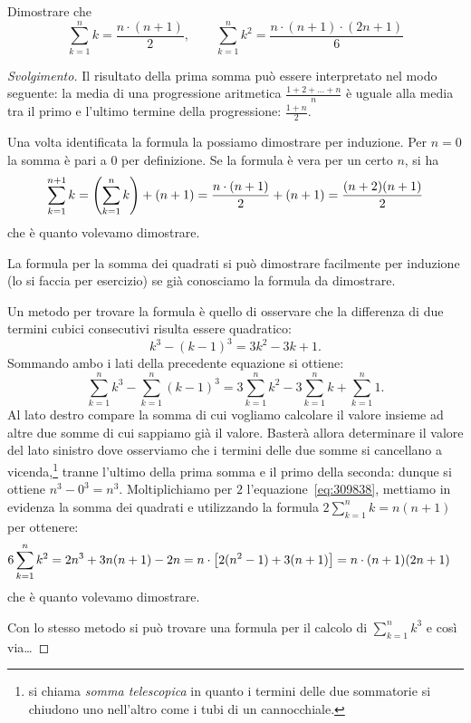 \begin{exercise}
  Dimostrare che 
  \[
    \sum_{k=1}^n k = \frac{n\cdot (n+1)}{2}, \qquad
    \sum_{k=1}^n k^2 = \frac{n\cdot (n+1)\cdot (2n+1)}{6}
  \]
\end{exercise}
\begin{proof}[Svolgimento]
Il risultato della prima somma può essere interpretato nel modo seguente:
la media di una progressione aritmetica $\frac{1+2+ \dots + n}{n}$ 
è uguale alla media tra il primo 
e l'ultimo termine della progressione: $\frac{1+n}{2}$.

Una volta identificata la formula la possiamo dimostrare per induzione.
Per $n=0$ la somma è pari a $0$ per definizione.
Se la formula è vera per un certo $n$, si ha 
\[
  \sum_{k=1}^{n+1} k = {\left( \sum_{k=1}^n k \right)} + (n+1)
   = \frac{n\cdot(n+1)}{2} + (n+1) 
   = \frac{(n+2)(n+1)}{2}
\]
che è quanto volevamo dimostrare.

La formula per la somma dei quadrati si può dimostrare facilmente per 
induzione (lo si faccia per esercizio) se già conosciamo la formula da 
dimostrare.

Un metodo per trovare la formula è quello di osservare che la differenza 
di due termini cubici consecutivi risulta essere quadratico:
\[
k^3 - (k-1)^3 = 3 k^2 - 3k + 1.  
\]
Sommando ambo i lati della precedente equazione si ottiene:
\begin{equation}\label{eq:309838}
\sum_{k=1}^n k^3 - \sum_{k=1}^n (k-1)^3 = 3\sum_{k=1}^n k^2-3\sum_{k=1}^n k+\sum_{k=1}^n 1.
\end{equation}
Al lato destro compare la somma di cui vogliamo calcolare il valore 
insieme ad altre due somme di cui sappiamo già il valore. 
Basterà allora determinare il valore del lato sinistro dove 
osserviamo che i termini delle due somme si cancellano 
a vicenda,\footnote{%
si chiama \emph{somma telescopica}
%
%
in quanto i termini delle due sommatorie si chiudono uno nell'altro 
come i tubi di un cannocchiale.}
tranne l'ultimo della prima somma 
e il primo della seconda: dunque si ottiene $n^3 - 0^3=n^3$.
Moltiplichiamo per $2$ l'equazione~\eqref{eq:309838},
mettiamo in evidenza la somma dei quadrati e 
utilizzando la formula $2\sum_{k=1}^n k = n(n+1)$
per ottenere:
\begin{align*}
  6 \sum_{k=1}^n k^2 
  &=  2n^3 + 3 n(n+1) - 2n
  = n \cdot {\left[ 2(n^2-1) + 3(n+1) \right]}
  = n \cdot (n+1)(2n+1)
\end{align*}
che è quanto volevamo dimostrare.

Con lo stesso metodo si può trovare una formula per il calcolo 
di $\sum_{k=1}^n k^3$ e così via\dots
\end{proof}

